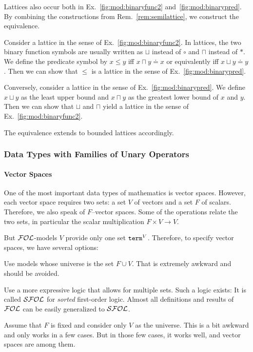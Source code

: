 \begin{remark}[Lattices]\label{rem:lattice}
Lattices also occur both in Ex.~\ref{fig:mod:binaryfunc2} and~\ref{fig:mod:binarypred}.
By combining the constructions from Rem.~\ref{rem:semilattice}, we construct the equivalence.

Consider a lattice in the sense of Ex.~\ref{fig:mod:binaryfunc2}.
In lattices, the two binary function symbols are usually written as $\sqcup$ instead of $\circ$ and $\sqcap$ instead of $\ast$.
We define the predicate symbol by $x\leq y$ iff $x\sqcap y\doteq x$ or equivalently iff $x\sqcup y\doteq y$.
Then we can show that $\leq$ is a lattice in the sense of Ex.~\ref{fig:mod:binarypred}.

Conversely, consider a lattice in the sense of Ex.~\ref{fig:mod:binarypred}.
We define $x\sqcup y$ as the least upper bound and $x\sqcap y$ as the greatest lower bound of $x$ and $y$.
Then we can show that $\sqcup$ and $\sqcap$ yield a lattice in the sense of Ex.~\ref{fig:mod:binaryfunc2}.

The equivalence extends to bounded lattices accordingly.
\end{remark}

\subsubsection{Data Types with Families of Unary Operators}

\paragraph{Vector Spaces}
One of the most important data types of mathematics is vector spaces.
However, each vector space requires two sets: a set $V$ of vectors and a set $F$ of scalars.
Therefore, we also speak of $F$--vector spaces.
Some of the operations relate the two sets, in particular the scalar multiplication $F\times V \to V$.

But ${\mathcal{FOL}}$-models $V$ provide only one set $\mathtt{term}^V$.
Therefore, to specify vector spaces, we have several options:
\begin{compactitem}
 \item Use models whose universe is the set $F\cup V$.
 That is extremely awkward and should be avoided.
 \item Use a more expressive logic that allows for multiple sets.
  Such a logic exists: It is called ${\mathcal{SFOL}}$ for \emph{sorted} first-order logic.
  Almost all definitions and results of ${\mathcal{FOL}}$ can be easily generalized to ${\mathcal{SFOL}}$.
 \item Assume that $F$ is fixed and consider only $V$ as the universe.
  This is a bit awkward and only works in a few cases.
  But in those few cases, it works well, and vector spaces are among them.
\end{compactitem}


